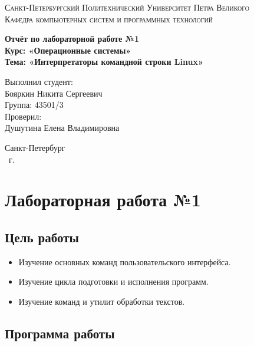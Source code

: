 \documentclass[14pt,a4paper,report]{report}
\begin{document}
\def\contentsname{Содержание}

\begin{titlepage}
	\begin{center}
		\textsc{Санкт-Петербургский Политехнический 
			Университет Петра Великого\\[5mm]
			Кафедра компьютерных систем и программных технологий}
		
		\vfill
		
		\textbf{Отчёт по лабораторной работе №1\\[3mm]
			Курс: «Операционные системы»\\[6mm]
			Тема: «Интерпретаторы командной строки Linux»\\[35mm]
		}
	\end{center}
	
	\hfill
	\begin{minipage}{.5\textwidth}
		Выполнил студент:\\[2mm] 
		Бояркин Никита Сергеевич\\
		Группа: 43501/3\\[5mm]
		
		Проверил:\\[2mm] 
		Душутина Елена Владимировна
	\end{minipage}
	\vfill
	\begin{center}
		Санкт-Петербург\\ \the\year\ г.
	\end{center}
\end{titlepage}

\tableofcontents
\clearpage

\chapter{Лабораторная работа №1}

\section{Цель работы}

\begin{itemize}
	\item Изучение основных команд пользовательского интерфейса.
	\item Изучение цикла подготовки и исполнения программ.
	\item Изучение команд и утилит обработки текстов.
\end{itemize}

\section{Программа работы}
\end{document}
